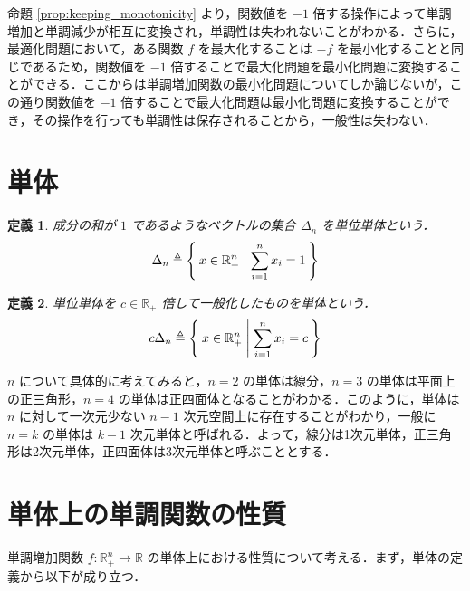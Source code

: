 \documentclass[a4paper,11pt]{jreport}
\newtheorem{definition}{定義}
\begin{document}
命題 \ref{prop:keeping_monotonicity} より，関数値を $ -1 $ 倍する操作によって単調増加と単調減少が相互に変換され，単調性は失われないことがわかる．さらに，最適化問題において，ある関数 $ f $ を最大化することは $ -f $ を最小化することと同じであるため，関数値を $ -1 $ 倍することで最大化問題を最小化問題に変換することができる．ここからは単調増加関数の最小化問題についてしか論じないが，この通り関数値を $ -1 $ 倍することで最大化問題は最小化問題に変換することができ，その操作を行っても単調性は保存されることから，一般性は失わない．\par

\section{単体}

\begin{definition}
成分の和が $ 1 $ であるようなベクトルの集合 $ \Delta_n $ を単位単体という．
$$ \Delta_n \triangleq \Set{ x \in \mathbb{R}^n_{+} | \sum_{i=1}^{n} x_i = 1 } $$
\end{definition}

\begin{definition}
単位単体を $ c \in \mathbb{R}_+ $ 倍して一般化したものを単体という．
$$ c \Delta_n \triangleq \Set{ x \in \mathbb{R}^n_{+} | \sum_{i=1}^{n} x_i = c } $$
\end{definition}

$ n $ について具体的に考えてみると，$ n=2 $ の単体は線分，$ n=3 $ の単体は平面上の正三角形，$ n=4 $ の単体は正四面体となることがわかる．このように，単体は $ n $ に対して一次元少ない $ n - 1 $ 次元空間上に存在することがわかり，一般に $ n = k $ の単体は $ k - 1 $ 次元単体と呼ばれる．よって，線分は1次元単体，正三角形は2次元単体，正四面体は3次元単体と呼ぶこととする．\par

\section{単体上の単調関数の性質} \label{sec:character_of_simplex_on_monotonic_function}

単調増加関数 $ f : \mathbb{R}^n_{+} \to \mathbb{R} $ の単体上における性質について考える．まず，単体の定義から以下が成り立つ．
\end{document}
